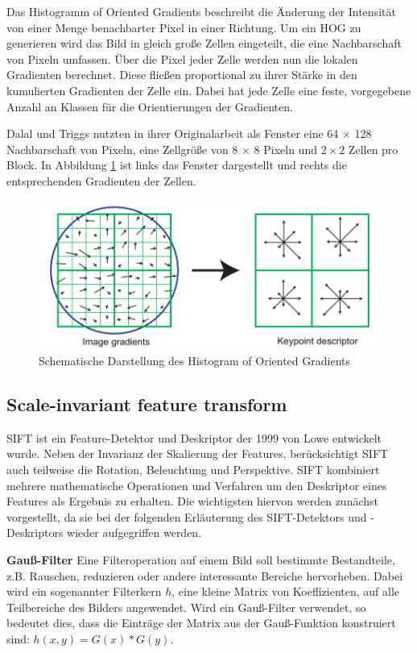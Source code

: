 Das Histogramm of Oriented Gradients beschreibt die Änderung der Intensität von einer Menge benachbarter Pixel in einer Richtung. Um ein HOG zu generieren wird das Bild in gleich große Zellen eingeteilt, die eine Nachbarschaft von Pixeln umfassen. Über die Pixel jeder Zelle werden nun die lokalen Gradienten berechnet. Diese fließen proportional zu ihrer Stärke in den kumulierten Gradienten der Zelle ein. Dabei hat jede Zelle eine feste, vorgegebene Anzahl an Klassen für die Orientierungen der Gradienten. 

Dalal und Triggs \cite{hog2005} nutzten in ihrer Originalarbeit als Fenster eine 64 $\times$ 128 Nachbarschaft von Pixeln, eine Zellgröße von 8 $\times$ 8 Pixeln und $2 \times 2$ Zellen pro Block. In Abbildung \ref{img:hog} ist links das Fenster dargestellt und rechts die entsprechenden Gradienten der Zellen. 

\begin{figure}
	\centering
	\includegraphics[scale=0.5]{images/hog.png}
	\caption{Schematische Darstellung des Histogram of Oriented Gradients  \cite{dif2004}}
	\label{img:hog}
\end{figure}

\subsection{Scale-invariant feature transform}

SIFT ist ein Feature-Detektor und Deskriptor der 1999 von Lowe \cite{dif2004} entwickelt wurde. Neben der Invarianz der Skalierung der Features, berücksichtigt SIFT auch teilweise die Rotation, Beleuchtung und Perspektive. SIFT kombiniert mehrere mathematische Operationen und Verfahren um den Deskriptor eines Features als Ergebnis zu erhalten. Die wichtigsten hiervon werden zunächst vorgestellt, da sie bei der folgenden Erläuterung des SIFT-Detektors und -Deskriptors wieder aufgegriffen werden.

\textbf{Gauß-Filter} Eine Filteroperation auf einem Bild soll bestimmte Bestandteile, z.B. Rauschen, reduzieren oder andere interessante Bereiche hervorheben. Dabei wird ein sogenannter Filterkern $h$, eine kleine Matrix von Koeffizienten, auf alle Teilbereiche des Bilders angewendet. Wird ein Gauß-Filter verwendet, so bedeutet dies, dass die Einträge der Matrix aus der Gauß-Funktion konstruiert sind: $h(x, y) = G(x) * G(y)$. 

